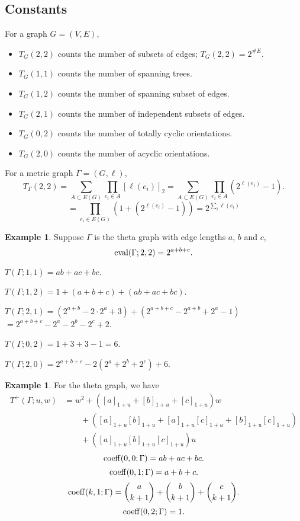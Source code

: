 \documentclass{amsart}
\theoremstyle{definition}
\newtheorem{eg}[thm]{Example}
\begin{document}
\subsection{Constants}
For a graph $G = (V,E)$,
\begin{itemize}
\item 
$T_G(2,2)$ counts the number of subsets of edges;
$T_G(2,2) = 2^{\# E}$.

\item 
$T_G(1,1)$ counts the number of spanning trees.

\item 
$T_G(1,2)$ counts the number of spanning subset of edges.

\item 
$T_G(2,1)$ counts the number of independent subsets of edges.

\item 
$T_G(0,2)$ counts the number of totally cyclic orientations.

\item 
$T_G(2,0)$ counts the number of acyclic orientations.
\end{itemize}

For a metric graph $\Gamma = (G,\ell)$,
\[ T_\Gamma(2,2) = \sum_{A \subset E(G)} \prod_{e_i \in A} [\ell(e_i)]_{2}
= \sum_{A \subset E(G)} \prod_{e_i \in A} (2^{\ell(e_i)} - 1) .\]
\[ = \prod_{e_i \in E(G)} (1 + (2^{\ell(e_i)} - 1))
 = 2^{\sum_i \ell(e_i)}\]

\begin{eg}
Suppose $\Gamma$ is the theta graph with edge lengths $a$, $b$ and $c$,
\[ {\rm eval}(\Gamma; 2,2) = 2^{a+b+c} .\]

$T(\Gamma; 1,1) = ab + ac + bc$.

$T(\Gamma; 1,2) = 1 + (a + b + c) + (ab + ac + bc)$.

$T(\Gamma; 2,1) = (2^{a+b}  -2\cdot 2^a + 3) + (2^{a+b+c}-2^{a+b} + 2^a - 1)$
$= 2^{a+b+c} - 2^a - 2^b - 2^c + 2$.

$T(\Gamma; 0,2) = 1 + 3 + 3 - 1 = 6$.

$T(\Gamma; 2,0) = 2^{a+b+c} - 2(2^a + 2^b + 2^c) + 6$.
\end{eg}

\begin{eg}
For the theta graph, we have
\begin{align*}
T^+(\Gamma; u,w) &= w^2 + ([a]_{1+u} + [b]_{1+u} + [c]_{1+u})w  \\
&\qquad + ([a]_{1+u} [b]_{1+u} + [a]_{1+u} [c]_{1+u}  + [b]_{1+u} [c]_{1+u}) \\
&\qquad + ([a]_{1+u} [b]_{1+u} [c]_{1+u})u
\end{align*}
$$ {\rm coeff}(0,0; \Gamma) = ab + ac + bc .$$
$$ {\rm coeff}(0,1; \Gamma) = a + b + c .$$
$$ {\rm coeff}(k,1; \Gamma) = \binom{a}{k+1} + \binom{b}{k+1} + \binom{c}{k+1} .$$
$$ {\rm coeff}(0,2; \Gamma) = 1 .$$

\end{eg}
\end{document}

